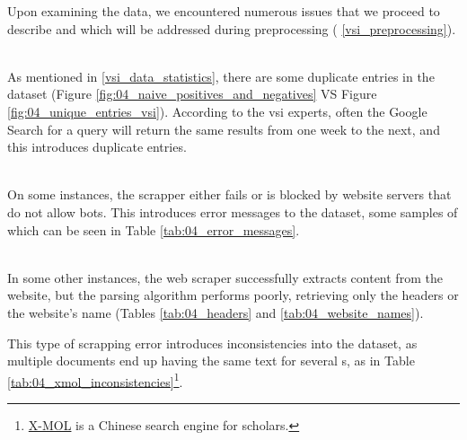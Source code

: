 \label{vsi_data_issues}


Upon examining the data, we encountered numerous issues that we proceed to describe and which will be addressed during preprocessing (\headerName{} \ref{vsi_preprocessing}).


\label{vsi_issues_duplicates}
\ \\

As mentioned in \headerName{} \ref{vsi_data_statistics}, there are some duplicate entries in the dataset (Figure \ref{fig:04_naive_positives_and_negatives} VS Figure \ref{fig:04_unique_entries_vsi}). According to the \gls{vsi} experts, often the Google Search for a query will return the same results from one week to the next, and this introduces duplicate entries.
 


\label{vsi_issues_error_messages}
\ \\

On some instances, the \trafilatura{} scrapper either fails or is blocked by website servers that do not allow bots. This introduces error messages to the dataset, some samples of which can be seen in Table \ref{tab:04_error_messages}.





\label{vsi_issues_scrapping_errors}
\ \\

In some other instances, the web scraper successfully extracts content from the website, but the parsing algorithm performs poorly, retrieving only the headers or the website's name (Tables \ref{tab:04_headers} and \ref{tab:04_website_names}).



This type of scrapping error introduces inconsistencies into the \VSI{} dataset, as multiple documents end up having the same text for several \contentType{}s, as in Table \ref{tab:04_xmol_inconsistencies}\footnote{\href{https://www.x-mol.com/}{X-MOL} is a Chinese search engine for scholars.}.





